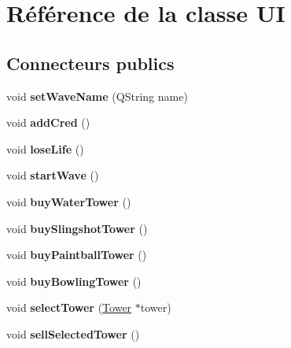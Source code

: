 \hypertarget{classUI}{
\section{Référence de la classe UI}
\label{classUI}
}
\subsection*{Connecteurs publics}
\begin{DoxyCompactItemize}
\item 
\hypertarget{classUI_a59dd7970680cae33350521f15e986259}{
void {\bfseries setWaveName} (QString name)}
\label{classUI_a59dd7970680cae33350521f15e986259}

\item 
\hypertarget{classUI_a00578d0269bf64abf71beb8b3e00a62b}{
void {\bfseries addCred} ()}
\label{classUI_a00578d0269bf64abf71beb8b3e00a62b}

\item 
\hypertarget{classUI_aea04048a2f3ab79ea3492c4f5e2e2c8d}{
void {\bfseries loseLife} ()}
\label{classUI_aea04048a2f3ab79ea3492c4f5e2e2c8d}

\item 
\hypertarget{classUI_adca7adc8d262fe82ce9eb3950b334416}{
void {\bfseries startWave} ()}
\label{classUI_adca7adc8d262fe82ce9eb3950b334416}

\item 
\hypertarget{classUI_a2dbc930f722c8acdf2c59a01a2760576}{
void {\bfseries buyWaterTower} ()}
\label{classUI_a2dbc930f722c8acdf2c59a01a2760576}

\item 
\hypertarget{classUI_a64d35e18b3b5b896caa69830190c1751}{
void {\bfseries buySlingshotTower} ()}
\label{classUI_a64d35e18b3b5b896caa69830190c1751}

\item 
\hypertarget{classUI_a098f1fd7e42c754f82e6d68aba33cbd1}{
void {\bfseries buyPaintballTower} ()}
\label{classUI_a098f1fd7e42c754f82e6d68aba33cbd1}

\item 
\hypertarget{classUI_ad9cc9c903122ceca1d750555ec95dda7}{
void {\bfseries buyBowlingTower} ()}
\label{classUI_ad9cc9c903122ceca1d750555ec95dda7}

\item 
\hypertarget{classUI_acc2450574743936721ad9d77b055d6d5}{
void {\bfseries selectTower} (\hyperlink{classTower}{Tower} $\ast$tower)}
\label{classUI_acc2450574743936721ad9d77b055d6d5}

\item 
\hypertarget{classUI_ad3666cc06e62117ba0ad65a1c3e6f1e5}{
void {\bfseries sellSelectedTower} ()}
\label{classUI_ad3666cc06e62117ba0ad65a1c3e6f1e5}

\end{DoxyCompactItemize}
